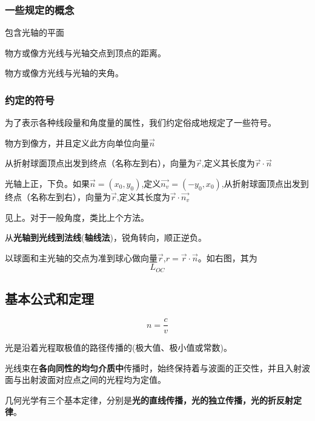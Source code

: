 \subsubsection{一些规定的概念}
\begin{description}[leftmargin=1.7cm,style=nextline,nosep]%
    \item[子午平面] 包含光轴的平面
    \item[截距] 物方或像方光线与光轴交点到顶点的距离。
    \item[倾斜角] 物方或像方光线与光轴的夹角。
\end{description}
\subsubsection{约定的符号}
为了表示各种线段量和角度量的属性，我们约定俗成地规定了一些符号。
\begin{description}[leftmargin=1.7cm,style=nextline,nosep]%
    \item[传播方向] 物方到像方，并且定义此方向单位向量$\vec{n}$
    \item[沿轴线段] 从折射球面顶点出发到终点（名称左到右），向量为$\vec{r}$,定义其长度为$\vec{r}\cdot \vec{n}$
    \item[垂轴线段] 光轴上正，下负。如果$\vec{n}=(x_0,y_0)$,定义$\vec{n_v}=(-y_0,x_0)$,从折射球面顶点出发到终点（名称左到右），向量为$\vec{r}$,定义其长度为$\vec{r}\cdot \vec{n_v}$
    \item[间隔$d$] 见上。对于一般角度，类比上个方法。
    \item[角度] 从\textbf{光轴到光线到法线}(\textbf{轴线法})，锐角转向，顺正逆负。
    \item[球面半径] 以球面和主光轴的交点为准到球心做向量$\vec{r}$,$r=\vec{r}\cdot \vec{n}$。如右图，其为
    $$
    L_{OC}
    $$
\end{description}

\subsection{基本公式和定理}
$$
n=\frac{c}{v}
$$
\begin{theorem}[费马原理]
光是沿着光程取极值的路径传播的(极大值、极小值或常数)。
\end{theorem}
\begin{theorem}[马吕斯定律]
    光线束在\textbf{各向同性的均匀介质中}传播时，始终保持着与波面的正交性，并且入射波面与出射波面对应点之间的光程均为定值。
\end{theorem}
几何光学有三个基本定律，分别是\textbf{光的直线传播，光的独立传播，光的折反射定律}。
